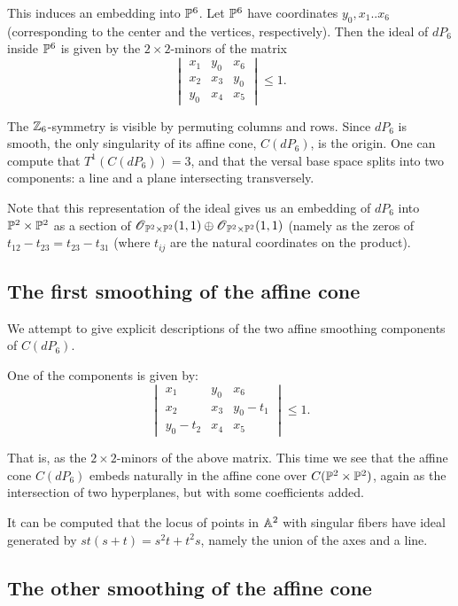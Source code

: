 \documentclass[11pt, english]{article}
\begin{document}
This induces an embedding into $\mathbb{P}^6$. Let $\mathbb{P}^6$ have coordinates $y_0,x_1..x_6$ (corresponding to the center and the vertices, respectively). Then the ideal of $dP_6$ inside $\mathbb{P}^6$ is given by the $2 \times 2$-minors of the matrix
\begin{equation}
\label{eqdp6}
\begin{vmatrix}
x_1 & y_0 & x_6 \\
x_2 & x_3 & y_0 \\
y_0 & x_4 & x_5
\end{vmatrix} \leq 1.
\end{equation}

The $\mathbb{Z}_6$-symmetry is visible by permuting columns and rows. Since $dP_6$ is smooth, the only singularity of its affine cone, $C(dP_6)$, is the origin. One can compute that $T^1(C(dP_6))=3$, and that the versal base space splits into two components: a line and a plane intersecting transversely.

Note that this representation of the ideal gives us an embedding of $dP_6$ into $\mathbb{P}^2 \times \mathbb{P}^2$ as a section of $\operatorname{\mathscr{O}}_{\mathbb{P}^2 \times \mathbb{P}^2}(1,1)\oplus\operatorname{\mathscr{O}}_{\mathbb{P}^2 \times \mathbb{P}^2}(1,1)$ (namely as the zeros of $t_{12}-t_{23}=t_{23}-t_{31}$ (where $t_{ij}$ are the natural coordinates on the product).

\subsection{The first smoothing of the affine cone}

We attempt to give explicit descriptions of the two affine smoothing components of $C(dP_6)$. 

One of the components is given by:
\[
\begin{vmatrix}
x_1 & y_0 & x_6 \\
x_2 & x_3 & y_0-t_1 \\
y_0-t_2 & x_4 & x_5
\end{vmatrix} \leq 1.
\]

That is, as the $2 \times 2$-minors of the above matrix. This time we see that the affine cone $C(dP_6)$ embeds naturally in the affine cone over $C(\mathbb{P}^2 \times \mathbb{P}^2)$, again as the intersection of two hyperplanes, but with some coefficients added.

It can be computed that the locus of points in $\mathbb{A}^2$ with singular fibers have ideal generated by $st(s+t)=s^2t+t^2s$, namely the union of the axes and a line.

\subsection{The other smoothing of the affine cone}
\end{document}
